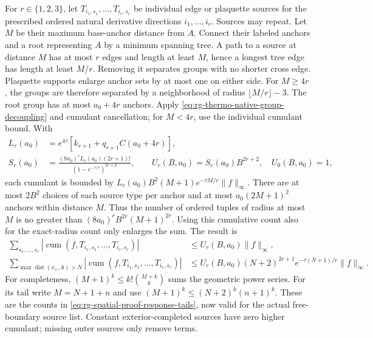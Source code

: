 For \(r\in\{1,2,3\}\), let \(T_{i_1,s_1},\ldots,T_{i_r,s_r}\)
be individual edge or plaquette sources for the prescribed ordered
natural derivative directions \(i_1,\ldots,i_r\). Sources may repeat.
Let \(M\) be their maximum base-anchor distance from \(A\). Connect
their labeled anchors and a root representing \(A\) by a minimum spanning
tree. A path to a source at distance \(M\) has at most \(r\) edges and
length at least \(M\), hence a longest tree edge has length at least
\(M/r\). Removing it separates groups with no shorter cross edge.
Plaquette supports enlarge anchor sets by at most one on either side.
For \(M\ge4r\), the groups are therefore separated by a neighborhood
of radius \(\lfloor M/r\rfloor-3\). The root group has at most
\(a_0+4r\) anchors. Apply
\cref{eq:rg-thermo-native-group-decoupling} and cumulant cancellation;
for \(M<4r\), use the individual cumulant bound. With
\begin{equation}
 \begin{split}
 L_r(a_0)&=e^{4\tau}[k_{r+1}+q_{r+1}C(a_0+4r)],\\
 S_r(a_0)&=\frac{(8a_0)^rL_r(a_0)(2r+1)!}
                    {(1-e^{-\tau/r})^{2r+2}},\qquad
 U_r(B,a_0)=S_r(a_0)B^{2r+2},\quad U_0(B,a_0)=1,
 \end{split}
 \label{eq:rg-thermo-native-response-constants}
\end{equation}
each cumulant is bounded by
\(L_r(a_0)B^2(M+1)e^{-\tau M/r}\|f\|_\infty\).
There are at most \(2B^2\) choices of each source type per anchor and at
most \(a_0(2M+1)^2\) anchors within distance \(M\). Thus the number of
ordered tuples of radius at most \(M\) is no greater than
\((8a_0)^rB^{2r}(M+1)^{2r}\). Using this cumulative count also for the
exact-radius count only enlarges the sum. The result is
\begin{equation}
 \begin{split}
 \sum_{s_1,\ldots,s_r}
 |\operatorname{cum}(f,T_{i_1,s_1},\ldots,T_{i_r,s_r})|
 &\le U_r(B,a_0)\|f\|_\infty,\\
 \sum_{\max\operatorname{dist}(x_s,A)>N}
 |\operatorname{cum}(f,T_{i_1,s_1},\ldots,T_{i_r,s_r})|
 &\le U_r(B,a_0)(N+2)^{2r+1}e^{-\tau(N+1)/r}\|f\|_\infty.
 \end{split}
 \label{eq:rg-thermo-native-source-tails}
\end{equation}
For completeness, \((M+1)^k\le k!{M+k\choose k}\) sums the geometric
power series. For its tail write \(M=N+1+n\) and use
\((M+1)^k\le(N+2)^k(n+1)^k\). These are the counts in
\cref{eq:rg-spatial-proof-response-tails}, now valid for the actual
free-boundary source list. Constant exterior-completed sources have zero
higher cumulant; missing outer sources only remove terms.

